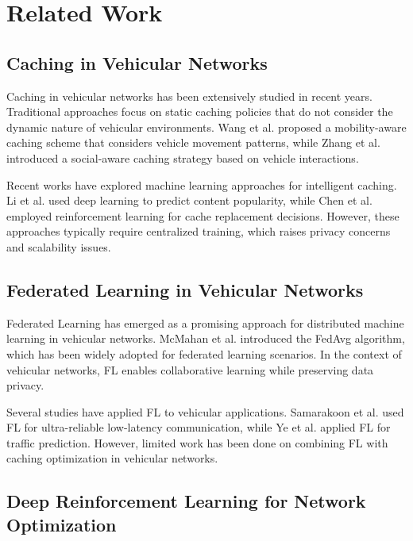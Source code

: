 \documentclass[conference]{IEEEtran}
\begin{document}
\section{Related Work}

\subsection{Caching in Vehicular Networks}

Caching in vehicular networks has been extensively studied in recent years. Traditional approaches focus on static caching policies that do not consider the dynamic nature of vehicular environments. Wang et al. \cite{wang2019} proposed a mobility-aware caching scheme that considers vehicle movement patterns, while Zhang et al. \cite{zhang2020} introduced a social-aware caching strategy based on vehicle interactions.

Recent works have explored machine learning approaches for intelligent caching. Li et al. \cite{li2021} used deep learning to predict content popularity, while Chen et al. \cite{chen2022} employed reinforcement learning for cache replacement decisions. However, these approaches typically require centralized training, which raises privacy concerns and scalability issues.

\subsection{Federated Learning in Vehicular Networks}

Federated Learning has emerged as a promising approach for distributed machine learning in vehicular networks. McMahan et al. \cite{mcmahan2017} introduced the FedAvg algorithm, which has been widely adopted for federated learning scenarios. In the context of vehicular networks, FL enables collaborative learning while preserving data privacy.

Several studies have applied FL to vehicular applications. Samarakoon et al. \cite{samarakoon2019} used FL for ultra-reliable low-latency communication, while Ye et al. \cite{ye2020} applied FL for traffic prediction. However, limited work has been done on combining FL with caching optimization in vehicular networks.

\subsection{Deep Reinforcement Learning for Network Optimization}
\end{document}
